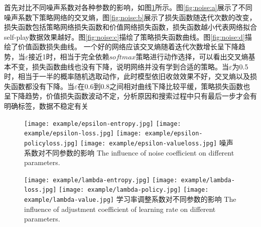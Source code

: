 首先对比不同噪声系数对各种参数的影响，如图\ref{fig:noise}所示。图\ref{fig:noise:a}展示了不同噪声系数下策略网络的交叉熵，图\ref{fig:noise:b}展示了损失函数随迭代次数的改变，损失函数包括策略网络损失函数和价值网络损失函数，损失函数越小代表网络拟合self-play数据效果越好。图\ref{fig:noise:c}描绘了策略损失函数曲线。图\ref{fig:noise:d}描绘了价值函数损失曲线。
一个好的网络应该交叉熵随着迭代次数增长呈下降趋势，当$\varepsilon$接近1时，相当于完全依赖$softmax$策略进行动作选择，可以看出交叉熵基本不变，损失函数曲线也没有下降，说明网络并没有学到合适的策略。当$\varepsilon$为0.5时，相当于一半的概率随机选取动作，此时模型依旧收敛效果不好，交叉熵以及损失函数都没有下降。当$\varepsilon$在0.6到0.8之间相对曲线下降比较平缓，策略损失函数也呈下降趋势，价值损失函数波动不定，分析原因和搜索过程中只有最后一步才会有明确标签，数据不稳定有关

\begin{figure}[htpb]
	\centering
	{\texttt{[image: example/epsilon-entropy.jpg]}}
	\hspace{0.5em}
	{\texttt{[image: example/epsilon-loss.jpg]}}
	\newline
	\centering
	{\texttt{[image: example/epsilon-policyloss.jpg]}}
	\hspace{0.5em}
	{\texttt{[image: example/epsilon-valueloss.jpg]}}
	\bicaption
	{噪声系数对不同参数的影响}
	{The influence of noise coefficient on different parameters.}
	\label{fig:noise}
\end{figure}

\begin{figure}[hbpt]
	\centering
	{\texttt{[image: example/lambda-entropy.jpg]}}
	{\texttt{[image: example/lambda-loss.jpg]}}
	\newline
	\centering
	{\texttt{[image: example/lambda-policy.jpg]}}
	{\texttt{[image: example/lambda-value.jpg]}}
	\bicaption
	{学习率调整系数对不同参数的影响}
	{The influence of adjustment coefficient of learning rate on different parameters.}
	\label{fig2response}
\end{figure}

